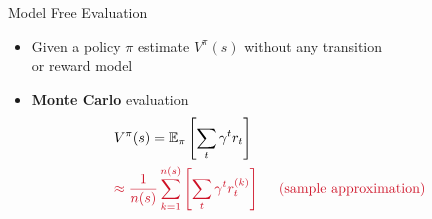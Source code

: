 \documentclass[11pt,table]{beamer}
\begin{document}
\begin{frame}{Model Free Evaluation}

\begin{itemize}
    \item Given a policy $\pi$ estimate $V^{\pi}(s)$ without any transition\\ or reward model

\item \textbf{Monte Carlo} evaluation
$$
\begin{aligned}
& V^{\pi}(s)=\mathbb{E}_{\pi}\left[\sum_{t} \gamma^{t} r_{t}\right] \\
& \textcolor{red1}{\approx \frac{1}{n(s)} \sum_{k=1}^{n(s)}\left[\sum_{t} \gamma^{t} r^{(k)}_{t}\right] \quad \text { (sample approximation) }}
\end{aligned}
$$

\end{itemize}
    
\end{frame}
\end{document}
